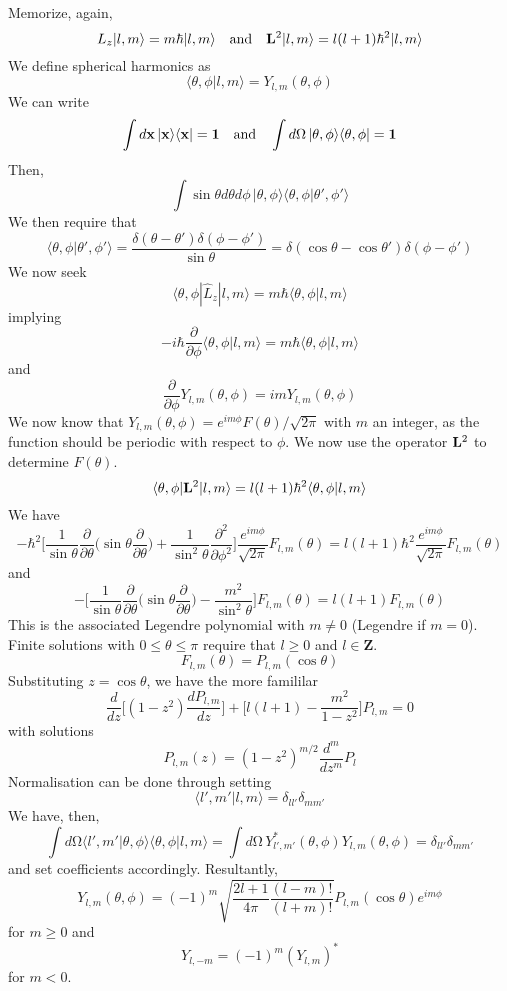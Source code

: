 \begin{thm}
Memorize, again,
\[L_{z}|l,m\rangle =m\hbar |l,m\rangle \quad \mathrm{and}\quad {\bf L}^2|l,m\rangle =l(l+1)\hbar ^2|l,m\rangle \]
We define spherical harmonics as
\[\langle \theta ,\phi |l,m\rangle =Y_{l,m}(\theta ,\phi )\]
We can write
\[\int d{\bf x}\,|{\bf x}\rangle \langle {\bf x}|={\bf 1}\quad\mathrm{and}\quad
\int d\mathrm{\Omega} \,|\theta ,\phi \rangle \langle \theta ,\phi |={\bf 1}\]
Then,
\[\int \sin \theta d\theta d\phi \,|\theta ,\phi \rangle \langle \theta ,\phi |\theta ',\phi '\rangle \]
We then require that
\[\langle \theta ,\phi |\theta ',\phi '\rangle =\dfrac{\delta (\theta -\theta ')\delta (\phi -\phi ')}{\sin \theta }=\delta (\cos \theta -\cos \theta ')\delta (\phi -\phi ')\]
We now seek
\[\langle \theta ,\phi |\hat{L}_{z}|l,m\rangle =m\hbar \langle \theta ,\phi |l,m\rangle \]
implying
\[-i\hbar \dfrac{\partial }{\partial \phi }\langle \theta ,\phi |l,m\rangle =m\hbar \langle \theta ,\phi |l,m\rangle  \]
and
\[\dfrac{\partial }{\partial \phi }Y_{l,m}(\theta ,\phi )=imY_{l,m}(\theta ,\phi ) \]
We now know that $Y_{l,m}(\theta ,\phi )=e^{im\phi }F(\theta )/\sqrt{2\pi }$ with $m$ an integer, as the function should be periodic with respect to $\phi $. We now use the  operator ${\bf L}^2$ to determine $F(\theta )$.
\[\langle \theta ,\phi |{\bf L}^2|l,m\rangle =l(l+1)\hbar ^2\langle \theta ,\phi |l,m\rangle \]
We have
\[-\hbar ^2\Bigg[\dfrac{1}{\sin \theta }\dfrac{\partial }{\partial \theta }\Big(\sin \theta \dfrac{\partial }{\partial \theta } \Big)+\dfrac{1}{\sin^2\theta }\dfrac{\partial ^2}{\partial \phi ^2} \Bigg]\dfrac{e^{im\phi }}{\sqrt{2\pi }}F_{l,m}(\theta  )=l(l+1)\hbar ^2\dfrac{e^{im\phi }}{\sqrt{2\pi }}F_{l,m}(\theta )\]
and 
\[-\Bigg[\dfrac{1}{\sin \theta }\dfrac{\partial }{\partial \theta }\Big(\sin \theta \dfrac{\partial }{\partial \theta }\Big)-\dfrac{m^2}{\sin ^2\theta } \Bigg]F_{l,m}(\theta )=l(l+1)F_{l,m}(\theta )\]
This is the associated Legendre polynomial with $m\ne 0$ (Legendre if $m=0$). Finite solutions with $0\leq \theta \leq \pi $ require that $l\geq 0$ and $l\in{\bm Z}$. 
\[F_{l,m}(\theta )=P_{l,m}(\cos \theta ) \]
Substituting $z=\cos \theta $, we have the more famililar 
\[\dfrac{d }{d z}\Big[(1-z^2)\dfrac{d P_{l,m}}{dz} \Big]+\Big[l(l+1)-\dfrac{m^2}{1-z^2}\Big]P_{l,m}=0 \]
with solutions
\[P_{l,m}(z)=(1-z^2)^{m/2}\dfrac{d ^{m}}{d z^{m}}P_{l} \]
Normalisation can be done through setting
\[\langle l',m'|l,m\rangle =\delta _{ll'}\delta _{mm'}\]
We have, then,
\[\int d\mathrm{\Omega} \langle l',m'|\theta ,\phi \rangle \langle \theta ,\phi |l,m\rangle =\int d\mathrm{\Omega}\,Y^{*}_{l',m'}(\theta ,\phi )Y_{l,m}(\theta ,\phi )=\delta _{ll'}\delta _{mm'}\]
and set coefficients accordingly. Resultantly,
\[Y_{l,m}(\theta ,\phi )=(-1)^{m}\sqrt{\dfrac{2l+1}{4\pi }\dfrac{(l-m)!}{(l+m)!}}P_{l,m}(\cos \theta )e^{im\phi }\]
for $m\geq 0$ and
\[Y_{l,-m}=(-1)^{m}(Y_{l,m})^{*}\]
for $m<0$. 
\end{thm}
